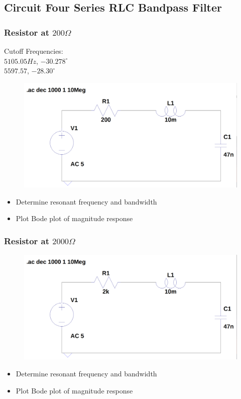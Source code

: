 \documentclass[12pt]{article}
\begin{document}
\subsection{Circuit Four Series RLC Bandpass Filter}
\subsubsection{Resistor at $200\Omega$}
Cutoff Frequencies:\\
$5105.05Hz$, $-30.278^\circ$\\
$5597.57$, $-28.30^\circ$

\begin{figure}[H]
	\includegraphics[width=\textwidth]{e6_04}
\end{figure}
\begin{itemize}
	\item Determine resonant frequency and bandwidth
	\item Plot Bode plot of magnitude response
\end{itemize}
\subsubsection{Resistor at $2000\Omega$}
\begin{figure}[H]
	\includegraphics[width=\textwidth]{e6_05}
\end{figure}
\begin{itemize}
	\item Determine resonant frequency and bandwidth
	\item Plot Bode plot of magnitude response
\end{itemize}
\end{document}
